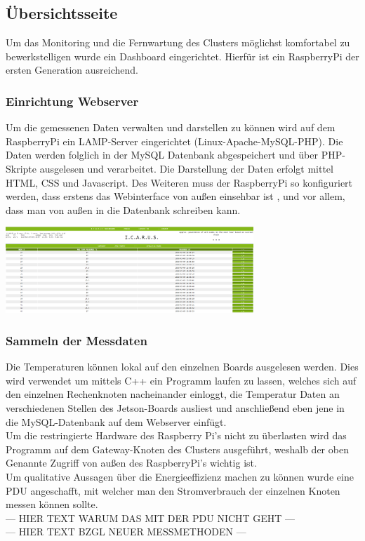 \subsection{Übersichtsseite}
Um das Monitoring und die Fernwartung des Clusters möglichst komfortabel zu bewerkstelligen wurde ein Dashboard eingerichtet. Hierfür ist ein RaspberryPi der ersten Generation ausreichend.
\subsubsection{Einrichtung Webserver}
Um die gemessenen Daten verwalten und darstellen zu können wird auf dem RaspberryPi ein LAMP-Server eingerichtet (Linux-Apache-MySQL-PHP). Die Daten werden folglich in der MySQL Datenbank abgespeichert und über PHP-Skripte ausgelesen und verarbeitet. Die Darstellung der Daten erfolgt mittel HTML, CSS und Javascript. Des Weiteren muss der RaspberryPi so konfiguriert werden, dass erstens das Webinterface von außen einsehbar ist , und vor allem, dass man von außen in die Datenbank schreiben kann.

\begin{minipage}{\textwidth}

\begin{center}
	\includegraphics[width=0.7\textwidth]{./Bilder/Dashboard/Dashboard_frontend.png}
	\label{fig:sample_figure}

\end{center}	
\end{minipage}

\subsubsection{Sammeln der Messdaten}
Die Temperaturen können lokal auf den einzelnen Boards ausgelesen werden. Dies wird verwendet um mittels C++ ein Programm laufen zu lassen, welches sich auf den einzelnen Rechenknoten nacheinander einloggt, die Temperatur Daten an verschiedenen Stellen des Jetson-Boards ausliest und anschließend eben jene in die MySQL-Datenbank auf dem Webserver einfügt.\\
Um die restringierte Hardware des Raspberry Pi's nicht zu überlasten wird das Programm auf dem Gateway-Knoten des Clusters ausgeführt, weshalb der oben Genannte Zugriff von außen des RaspberryPi's wichtig ist. \\
Um qualitative Aussagen über die Energieeffizienz machen zu können wurde eine PDU angeschafft, mit welcher man den Stromverbrauch der einzelnen Knoten messen können sollte. \\
--- HIER TEXT WARUM DAS MIT DER PDU NICHT GEHT ---\\
--- HIER TEXT BZGL NEUER MESSMETHODEN ---